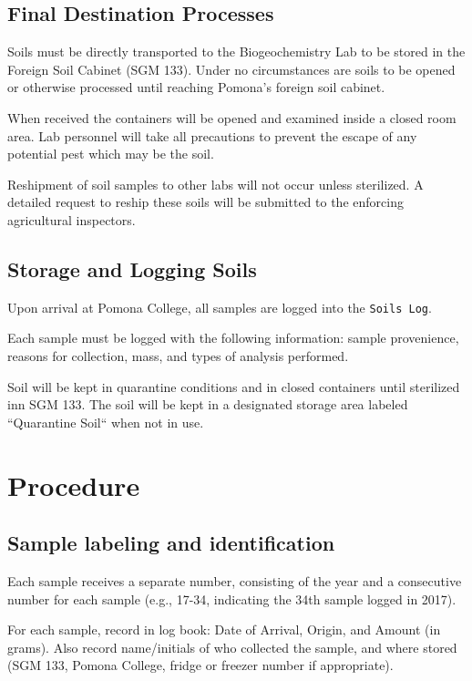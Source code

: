 \documentclass[12pt]{../SOP3}\usepackage[]{graphicx}\usepackage[]{color}
\begin{document}
\subsection{Final Destination Processes}

\NP Soils must be directly transported to the Biogeochemistry Lab to be stored in the Foreign Soil Cabinet (SGM 133). Under no circumstances are soils to be opened or otherwise processed until reaching Pomona's foreign soil cabinet. 

\NP When received the containers will be opened and examined inside a closed room area. Lab personnel will take all precautions to prevent the escape of any potential pest which may be the soil. 

\NP Reshipment of soil samples to other labs will not occur unless sterilized. A detailed request to reship these soils will be submitted to the enforcing agricultural inspectors. 

\subsection{Storage and Logging Soils}

\NP Upon arrival at Pomona College, all samples are logged into the \texttt{Soils Log}.

\NP Each sample must be logged with the following information: sample provenience, reasons for collection, mass, and types of analysis performed.

\NP Soil will be kept in quarantine conditions and in closed containers until sterilized inn SGM 133. The soil will be kept in a designated storage area labeled ``Quarantine Soil`` when not in use.

\section{Procedure}

\subsection{Sample labeling and identification}

\NP Each sample receives a separate number, consisting of the year and a consecutive number for each sample (e.g., 17-34, indicating the 34th sample logged in 2017).

\NP For each sample, record in log book: Date of Arrival, Origin, and Amount (in grams). Also record name/initials of who collected the sample, and where stored (SGM 133, Pomona College, fridge or freezer number if appropriate). 
\end{document}
